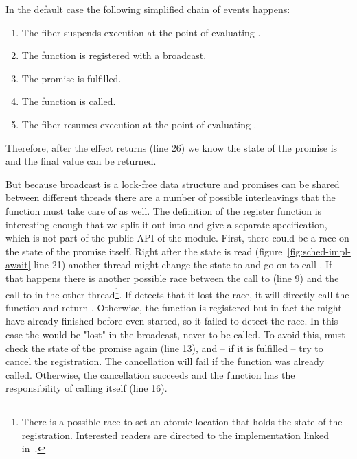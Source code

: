 In the default case the following simplified chain of events happens:
\begin{enumerate}
  \item The fiber suspends execution at the point of evaluating .
  \item The  function is registered with a broadcast.
  \item The promise is fulfilled.
  \item The  function is called.
  \item The fiber resumes execution at the point of evaluating .
\end{enumerate}
Therefore, after the \esuspend{} effect returns (line 26) we know the state of the promise is  and the final value can be returned.

But because broadcast is a lock-free data structure and promises can be shared between different threads there are a number of possible interleavings that the  function must take care of as well.
The definition of the register function is interesting enough that we split it out into  and give a separate specification, which is not part of the public API of the module.
First, there could be a race on the state of the promise itself.
Right after the state is read (figure~\ref{fig:sched-impl-await} line 21) another thread might change the state to  and go on to call .
If that happens there is another possible race between the call to  (line 9) and the call to  in the other thread\footnote{There is a possible race to set an atomic location that holds the state of the registration. Interested readers are directed to the implementation linked in~\cite{koval2023cqs}.}.
If  detects that it lost the race, it will directly call the  function and return .
Otherwise, the  function is registered but in fact the  might have already finished before  even started, so it failed to detect the race.
In this case the  would be "lost" in the broadcast, never to be called.
To avoid this,  must check the state of the promise again (line 13), and -- if it is fulfilled -- try to cancel the  registration.
The cancellation will fail if the  function was already called.
Otherwise, the cancellation succeeds and the  function has the responsibility of calling  itself (line 16).

